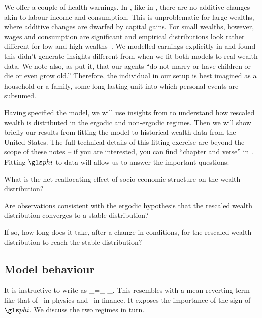 We offer a couple of health warnings. In \RGBM, like in \GBM, there are no additive changes akin to labour income and consumption. This is unproblematic for large wealths, where additive changes are dwarfed by capital gains. For small wealths, however, wages and consumption are significant and empirical distributions look rather different for low and high wealths~\cite{DragulescuYakovenko2001}. We modelled earnings explicitly in \cite{BermanPetersAdamou2017} and found this didn't generate insights different from \RGBM when we fit both models to real wealth data. We note also, as \cite[p.~41]{meade1964efficiency} put it, that our agents ``do not marry or have children or die or even grow old.'' Therefore, the individual in our setup is best imagined as a household or a family, \ie some long-lasting unit into which personal events are subsumed.

Having specified the model, we will use insights from  to understand how rescaled wealth is distributed in the ergodic and non-ergodic regimes. Then we will show briefly our results from fitting the model to historical wealth data from the United States. The full technical details of this fitting exercise are beyond the scope of these notes -- if you are interested, you can find ``chapter and verse'' in \cite{BermanPetersAdamou2017}. Fitting $\gphi$ to data will allow us to answer the important questions:
\bi
\item
What is the net reallocating effect of socio-economic structure on the wealth distribution?
\item
Are observations consistent with the ergodic hypothesis that the rescaled wealth distribution converges to a stable distribution?
\item
If so, how long does it take, after a change in conditions, for the rescaled wealth distribution to reach the stable distribution?
\ei


\subsection{Model behaviour}
It is instructive to write  as
\be
\gd\x_\gi=\underbrace{\x_\gi \left[\gmu \gd\t+\gsigma \gd\gW_\gi\left(\t\right)\right]}_{} \;\; \underbrace{ - \;\; \gphi (\x_\gi-\ave{\x}_\N) \gd\t}_{}.
\ee
This resembles \GBM with a mean-reverting term like that of~\cite{UhlenbeckOrnstein1930} in physics and~\cite{Vasicek1977} in finance. It exposes the importance of the sign of $\gphi$. We discuss the two regimes in turn.

